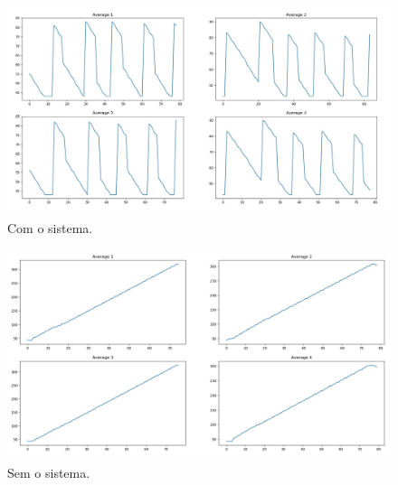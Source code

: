 \begin{figure}[ht]
    \begin{center}
    \includegraphics[width=1\textwidth]{figuras/tripDurationTL.JPG}
    \end{center}
    \caption[Duração da viagem]{Com o sistema.}
    \label{tripTL}
\end{figure}

\begin{figure}[ht]
    \begin{center}
    \includegraphics[width=1\textwidth]{figuras/tripDurationNoTL.JPG}
    \end{center}
    \caption[Duração da viagem]{Sem o sistema.}
    \label{tripNoTL}
\end{figure}
